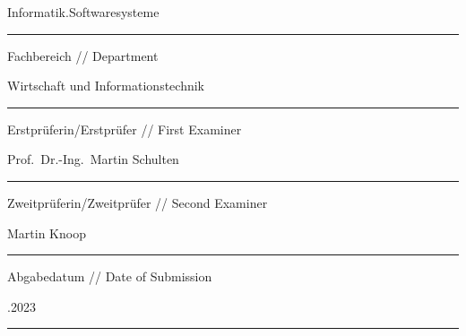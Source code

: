 \begin{titlepage}
        \vskip -0.05cm

        \begingroup
        \fontsize{12pt}{14pt}\selectfont
        Informatik.Softwaresysteme
        \endgroup
        \vskip -0.1cm

        \noindent\rule{14.4cm}{0.4pt}

        \vskip 0.05cm

        \begingroup
        \fontsize{8pt}{6pt}\selectfont
        Fachbereich // Department
        \endgroup

        \vskip -0.05cm

        \begingroup
        \fontsize{12pt}{14pt}\selectfont
        Wirtschaft und Informationstechnik
        \endgroup
        \vskip -0.1cm

        \noindent\rule{14.4cm}{0.4pt}

        \vskip 0.05cm

        \begingroup
        \fontsize{8pt}{6pt}\selectfont
        Erstprüferin/Erstprüfer // First Examiner
        \endgroup

        \vskip -0.05cm

        \begingroup
        \fontsize{12pt}{14pt}\selectfont
        Prof.\ Dr.-Ing.\ Martin Schulten
        \endgroup
        \vskip -0.1cm

        \noindent\rule{14.4cm}{0.4pt}

        \vskip 0.05cm

        \begingroup
        \fontsize{8pt}{6pt}\selectfont
        Zweitprüferin/Zweitprüfer // Second Examiner
        \endgroup

        \vskip -0.05cm

        \begingroup
        \fontsize{12pt}{14pt}\selectfont
        Martin Knoop
        \endgroup
        \vskip -0.1cm

        \noindent\rule{14.4cm}{0.4pt}

        \vskip 0.05cm

        \begingroup
        \fontsize{8pt}{6pt}\selectfont
        Abgabedatum // Date of Submission
        \endgroup

        \vskip -0.05cm

        \begingroup
        \fontsize{12pt}{14pt}.2023
        \endgroup
        \vskip -0.1cm

        \noindent\rule{14.4cm}{0.4pt}
    \restoregeometry
\end{titlepage}
\clearpage
